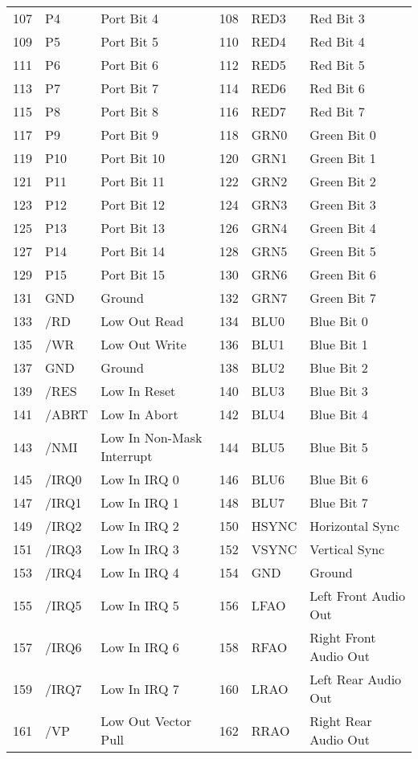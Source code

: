 \documentclass[letterpaper,12pt]{book}
\begin{document}
\begin{tabular}{|l|l|l|l|l|l|}
	107 & P4 & Port Bit 4 & 108 & RED3 & Red Bit 3\\
	109 & P5 & Port Bit 5 & 110 & RED4 & Red Bit 4\\
	111 & P6 & Port Bit 6 & 112 & RED5 & Red Bit 5\\
	113 & P7 & Port Bit 7 & 114 & RED6 & Red Bit 6\\
	115 & P8 & Port Bit 8 & 116 & RED7 & Red Bit 7\\
	117 & P9 & Port Bit 9 & 118 & GRN0 & Green Bit 0\\
	119 & P10 & Port Bit 10 & 120 & GRN1 & Green Bit 1\\
	121 & P11 & Port Bit 11 & 122 & GRN2 & Green Bit 2\\
	123 & P12 & Port Bit 12 & 124 & GRN3 & Green Bit 3\\
	125 & P13 & Port Bit 13 & 126 & GRN4 & Green Bit 4\\
	127 & P14 & Port Bit 14 & 128 & GRN5 & Green Bit 5\\
	129 & P15 & Port Bit 15 & 130 & GRN6 & Green Bit 6\\
	131 & GND & Ground & 132 & GRN7 & Green Bit 7\\
	133 & /RD & Low Out Read & 134 & BLU0 & Blue Bit 0\\
	135 & /WR & Low Out Write & 136 & BLU1 & Blue Bit 1\\
	137 & GND & Ground & 138 & BLU2 & Blue Bit 2\\
	139 & /RES & Low In Reset & 140 & BLU3 & Blue Bit 3\\
	141 & /ABRT & Low In Abort & 142 & BLU4 & Blue Bit 4\\
	143 & /NMI & Low In Non-Mask Interrupt & 144 & BLU5 & Blue Bit 5\\
	145 & /IRQ0 & Low In IRQ 0 & 146 & BLU6 & Blue Bit 6\\
	147 & /IRQ1 & Low In IRQ 1 & 148 & BLU7 & Blue Bit 7\\
	149 & /IRQ2 & Low In IRQ 2 & 150 & HSYNC & Horizontal Sync\\
	151 & /IRQ3 & Low In IRQ 3 & 152 & VSYNC & Vertical Sync\\
	153 & /IRQ4 & Low In IRQ 4 & 154 & GND & Ground\\
	155 & /IRQ5 & Low In IRQ 5 & 156 & LFAO & Left Front Audio Out\\
	157 & /IRQ6 & Low In IRQ 6 & 158 & RFAO & Right Front Audio Out\\
	159 & /IRQ7 & Low In IRQ 7 & 160 & LRAO & Left Rear Audio Out\\
	161 & /VP & Low Out Vector Pull & 162 & RRAO & Right Rear Audio Out\\

\end{tabular}
\end{document}
